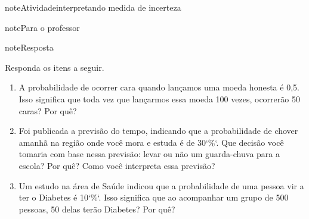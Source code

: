 \begin{sphinxadmonition}{note}{Atividade}{interpretando medida de incerteza}
\begin{sphinxadmonition}{note}{Para o professor}
\begin{sphinxadmonition}{note}{Resposta}
\begin{enumerate}
\end{enumerate}
\end{sphinxadmonition}
\end{sphinxadmonition}

Responda os itens a seguir.
\begin{enumerate}
\item {} 
A probabilidade de ocorrer cara quando lançamos uma moeda honesta é 0,5. Isso significa que toda vez que lançarmos essa moeda 100 vezes, ocorrerão 50 caras? Por quê?

\item {} 
Foi publicada a previsão do tempo, indicando que a probabilidade de chover amanhã na região onde você mora e estuda é de 30{}`\%{}`. Que decisão você tomaria com base nessa previsão: levar ou não um guarda-chuva para a escola? Por quê? Como você interpreta essa previsão?

\item {} 
Um estudo na área de Saúde indicou que a probabilidade de uma pessoa vir a ter o Diabetes é 10{}`\%{}`. Isso significa que ao acompanhar um grupo de 500 pessoas, 50 delas terão Diabetes? Por quê?

\end{enumerate}
\end{sphinxadmonition}
